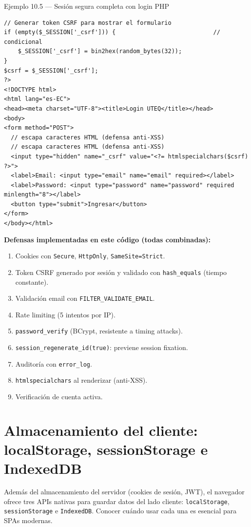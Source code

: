 \documentclass[11pt,a4paper,openany]{book}
\begin{document}
\begin{cajaejemplo}{Ejemplo 10.5 --- Sesión segura completa con login PHP}
\begin{lstlisting}[style=php,caption={login.php con todas las prácticas},label=lst:10.12]
// Generar token CSRF para mostrar el formulario
if (empty($_SESSION['_csrf'])) {                            // condicional
    $_SESSION['_csrf'] = bin2hex(random_bytes(32));
}
$csrf = $_SESSION['_csrf'];
?>
<!DOCTYPE html>
<html lang="es-EC">
<head><meta charset="UTF-8"><title>Login UTEQ</title></head>
<body>
<form method="POST">
  // escapa caracteres HTML (defensa anti-XSS)
  // escapa caracteres HTML (defensa anti-XSS)
  <input type="hidden" name="_csrf" value="<?= htmlspecialchars($csrf) ?>">
  <label>Email: <input type="email" name="email" required></label>
  <label>Password: <input type="password" name="password" required minlength="8"></label>
  <button type="submit">Ingresar</button>
</form>
</body></html>
\end{lstlisting}

\textbf{Defensas implementadas en este código (todas combinadas):}
\begin{enumerate}
\item Cookies con \texttt{Secure}, \texttt{HttpOnly},
\texttt{SameSite=Strict}.
\item Token CSRF generado por sesión y validado con
\texttt{hash\_equals} (tiempo constante).
\item Validación email con \texttt{FILTER\_VALIDATE\_EMAIL}.
\item Rate limiting (5 intentos por IP).
\item \texttt{password\_verify} (BCrypt, resistente a timing attacks).
\item \texttt{session\_regenerate\_id(true)}: previene session
fixation.
\item Auditoría con \texttt{error\_log}.
\item \texttt{htmlspecialchars} al renderizar (anti-XSS).
\item Verificación de cuenta activa.
\end{enumerate}
\end{cajaejemplo}

\section{Almacenamiento del cliente: localStorage, sessionStorage e IndexedDB}

Además del almacenamiento del servidor (cookies de sesión,
JWT), el navegador ofrece tres APIs nativas para guardar datos del
lado cliente: \texttt{localStorage}, \texttt{sessionStorage} e
\texttt{IndexedDB}. Conocer cuándo usar cada una es esencial para
SPAs modernas.
\end{document}
